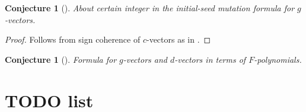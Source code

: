 \documentclass[12pt]{amsart}
\newtheorem{conjecture}[theorem]{Conjecture}
\begin{document}
\begin{conjecture}[{\cite[Conjecture 6.10]{fomin-zelevinsky4}}]
  About certain integer in the initial-seed mutation formula for $g$-vectors.
\end{conjecture}
\begin{proof}
  Follows from sign coherence of $c$-vectors as in \cite[Proposition 4.2]{NZ12}.
\end{proof}

\begin{conjecture}[{\cite[Conjectures 6.11 and 7.17]{fomin-zelevinsky4}}]
  Formula for $g$-vectors and $d$-vectors in terms of $F$-polynomials.
\end{conjecture}

  \section{TODO list}
\end{document}
